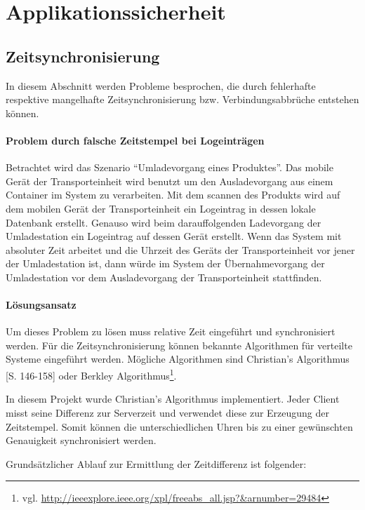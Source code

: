 \section{Applikationssicherheit}
\label{sec:security}

\subsection{Zeitsynchronisierung}
\label{subsec:timesync}

In diesem Abschnitt werden Probleme besprochen, die durch fehlerhafte respektive
	mangelhafte Zeitsynchronisierung bzw. Verbindungsabbrüche entstehen
	können.

\paragraph{Problem durch falsche Zeitstempel bei Logeinträgen} Betrachtet wird das
	Szenario ``Umladevorgang eines Produktes''. Das mobile Gerät der Transporteinheit
	wird benutzt um den Ausladevorgang aus einem Container im System zu verarbeiten.
	Mit dem scannen des Produkts wird auf dem mobilen Gerät der Transporteinheit ein
	Logeintrag in dessen lokale Datenbank erstellt. Genauso wird beim darauffolgenden 
	Ladevorgang der Umladestation ein Logeintrag auf dessen Gerät erstellt. Wenn das
	System mit absoluter Zeit arbeitet und die Uhrzeit des Geräts der Transporteinheit
	vor jener der Umladestation ist, dann würde im System der Übernahmevorgang der
	Umladestation vor dem Ausladevorgang der Transporteinheit stattfinden.


\paragraph{Lösungsansatz} Um dieses Problem zu lösen muss relative Zeit eingeführt und
	synchronisiert werden. Für die Zeitsynchronisierung können bekannte Algorithmen
	für verteilte Systeme eingeführt werden. Mögliche Algorithmen sind Christian's
	Algorithmus \cite{Christian89}[S. 146-158] oder Berkley Algorithmus\footnote{vgl.
	\url{http://ieeexplore.ieee.org/xpl/freeabs_all.jsp?&arnumber=29484}}.

In diesem Projekt wurde Christian's Algorithmus implementiert. Jeder Client misst seine
	Differenz zur Serverzeit und verwendet diese zur Erzeugung der Zeitstempel. Somit
	können die unterschiedlichen Uhren bis zu einer gewünschten Genauigkeit
	synchronisiert werden.

Grundsätzlicher Ablauf zur Ermittlung der Zeitdifferenz ist folgender:

